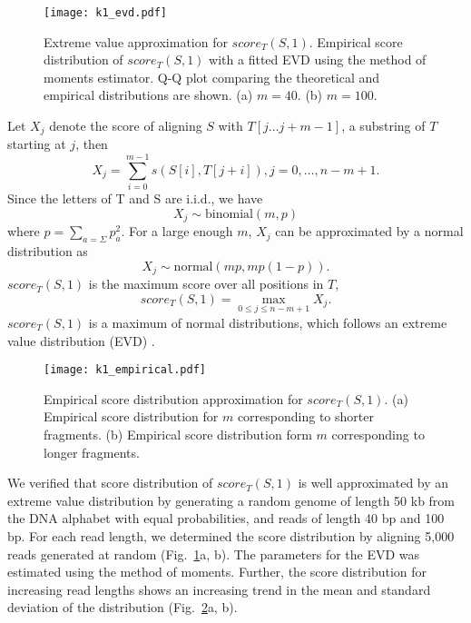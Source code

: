 \begin{figure}[t!]
\centering
\texttt{[image: k1\_evd.pdf]}
\caption[Extreme value distribution approximation for $score_T(S,1)$]{
  Extreme value approximation for $score_T(S,1)$.
  Empirical score distribution of $score_T(S,1)$ with a fitted
  EVD using the method of moments estimator.
  Q-Q plot comparing the theoretical and empirical distributions are shown.
  (a) $m=40$.
  (b) $m=100$.}
\label{evd_approx}
\end{figure}

Let $X_j$ denote the score of aligning $S$ with $T[j \dots j+m-1]$, a
substring of $T$ starting at $j$, then \[X_j = \sum_{i=0}^{m-1}
s(S[i],T[j+i]), j = 0, \dots, n-m+1.\] Since the letters of T and S
are i.i.d., we have \[X_j \sim \text{binomial}(m,p)\] where $p = \sum_{a=\Sigma}
p_a^2$.  For a large enough $m$, $X_j$ can be approximated by a normal
distribution as \[X_j \sim \text{normal}(mp, mp(1-p)).  \] $score_T(S,1)$ is the
maximum score over all positions in $T$, \[score_T(S,1) = \max_{0 \leq j
\leq n-m+1} X_j.\] $score_T(S,1)$ is a maximum of normal distributions,
which follows an extreme value distribution (EVD)
\citep{kotz2000extreme}.

\begin{figure}[t!]
\centering
\texttt{[image: k1\_empirical.pdf]}
\caption[Empirical score distribution for $score_T(S,1)$]{
  Empirical score distribution approximation for $score_T(S,1)$.
  (a) Empirical score distribution for $m$ corresponding to shorter
  fragments.
  (b) Empirical score distribution form $m$ corresponding to longer
  fragments.}
\label{evd_empirical}
\end{figure}

We verified that score distribution of $score_T(S,1)$ is well
approximated by an extreme value distribution by generating a random
genome of length 50 kb from the DNA alphabet with equal probabilities,
and reads of length 40 bp and 100 bp. For each read length, we
determined the score distribution by aligning 5,000 reads generated at
random (Fig.~\ref{evd_approx}a, b). The parameters for the EVD was
estimated using the method of moments.
Further, the score distribution for increasing read lengths shows an
increasing trend in the mean and standard deviation of the distribution
(Fig.~\ref{evd_empirical}a, b).


